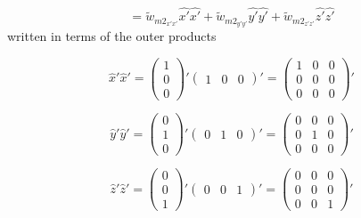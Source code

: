 \documentclass[double,12pt]{beavtex}
\begin{document}
\begin{equation}{=\widetilde{w}_{{m2}_{x'x'}}\hat{x'}\hat{x'}+\widetilde{w}_{{m2}_{y'y'}}\hat{y'}\hat{y'}+\widetilde{w}_{{m2}_{z'z'}}\hat{z'}\hat{z'}}\end{equation}
written in terms of the outer products

\begin{displaymath}{\hat{x}'\hat{x}'= \left(\begin{array}{c} 1 \\ 0 \\ 0 \end{array}\right)'\left(\begin{array}{ccc} 1 & 0 & 0 \end{array}\right)'=\left(\begin{array}{ccc} 1 & 0 & 0 \\ 0 & 0 & 0 \\ 0 & 0 & 0 \end{array}\right)'}\end{displaymath}

\begin{displaymath}{\hat{y}'\hat{y}'= \left(\begin{array}{c} 0 \\ 1 \\ 0 \end{array}\right)'\left(\begin{array}{ccc} 0 & 1 & 0 \end{array}\right)'=\left(\begin{array}{ccc} 0 & 0 & 0 \\ 0 & 1 & 0 \\ 0 & 0 & 0 \end{array}\right)'}\end{displaymath}

\begin{displaymath}{\hat{z}'\hat{z}'= \left(\begin{array}{c} 0 \\ 0 \\ 1 \end{array}\right)'\left(\begin{array}{ccc} 0 & 0 & 1 \end{array}\right)'=\left(\begin{array}{ccc} 0 & 0 & 0 \\ 0 & 0 & 0 \\ 0 & 0 & 1 \end{array}\right)'}\end{displaymath}
\end{document}
